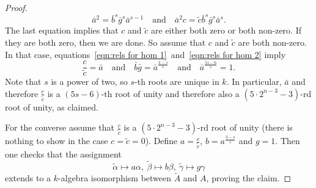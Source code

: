 \documentclass{amsart}
\theoremstyle{plain}\newtheorem{Theorem}{Theorem}[section]
\theoremstyle{plain}\newtheorem{Conjecture}[Theorem]{Conjecture}
\theoremstyle{plain}\newtheorem{Corollary}[Theorem]{Corollary}
\theoremstyle{plain}\newtheorem{Lemma}[Theorem]{Lemma}
\theoremstyle{plain}\newtheorem{Proposition}[Theorem]{Proposition}
\theoremstyle{definition}\newtheorem{Definition}[Theorem]{Definition}
\theoremstyle{definition}\newtheorem{Example}[Theorem]{Example}
\theoremstyle{definition}\newtheorem{Examples}[Theorem]{Examples}
\theoremstyle{definition}\newtheorem{Exercise}[Theorem]{Exercise}
\theoremstyle{definition}\newtheorem{Notation}[Theorem]{Notation}
\theoremstyle{definition}\newtheorem{Remark}[Theorem]{Remark}
\theoremstyle{definition}\newtheorem{Remarks}[Theorem]{Remarks}
\numberwithin{equation}{section}
\begin{document}
\begin{proof}
\begin{equation}
    \bar a^2 = \bar b^s \bar g^s\bar a^{s-1} \quad \textrm{and} \quad \bar a^2 c= \tilde c \bar b^s \bar g^s \bar a^s.
  \end{equation}
  The last equation implies that $c$ and $\tilde c$ are either both zero or both non-zero. If they are both zero, then we are done. So assume that $c$ and $\tilde c$ are both non-zero. 
  In that case, equations~\eqref{eqn:rels for hom 1}~and~\eqref{eqn:rels for hom 2} imply 
  $$
    \frac{c}{\tilde c} = \bar a \quad\textrm{and} \quad \bar b \bar g =\bar a^{\frac{3-s}{s}} \quad \textrm{and} \quad \bar a^{\frac{5s-6}{s}}=1.
  $$
  Note that $s$ is a power of two, so $s$-th roots are unique in $k$. In particular, $\bar a$ and therefore $\frac{c}{\tilde c}$ is a $(5s-6)$-th root of unity and therefore also a $(5\cdot 2^{n-3}-3)$-rd root of unity, as claimed.

  For the converse assume that $\frac{c}{\tilde c}$ is a $(5\cdot 2^{n-3}-3)$-rd root of unity (there is nothing to show in the case $c=\tilde c=0$). Define $a=\frac{c}{\tilde c}$, $b=a^{\frac{3-s}{s}}$ and $g=1$. Then one checks that the assignment
  $$
    \tilde \alpha \mapsto a \alpha, \ \tilde \beta \mapsto b \beta, \ \tilde \gamma \mapsto g \gamma
  $$
  extends to a $k$-algebra isomorphism between $\tilde A$ and $A$, proving the claim.
\end{proof}
\end{document}
